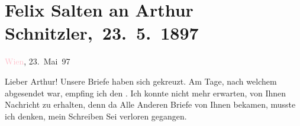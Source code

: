 

\renewcommand{\erwaehntePersonen}{Personen: Richard Beer-Hofmann,  Elisabeth von Österreich-Ungarn,  Franz Joseph I. von Österreich-Ungarn, Paul Goldmann, Hugo von Hofmannsthal, Richard Metzl, Louise Metzl, Felix Salten, Ottilie Salten, Adele Sandrock}
\renewcommand{\erwaehnteInstitutionen}{Institutionen: Franz-Joseph-Orden}
\renewcommand{\erwaehnteOrte}{Orte: London, Ostsee, Paris, Riga, Russland, Wien}
\renewcommand{\erwaehnteWerke}{}
\section[ Felix Salten an Arthur Schnitzler, 23. 5. 1897]{Felix Salten an Arthur Schnitzler, 23. 5. 1897}
\nopagebreak{}
\rehead{ }\normalsize\beginnumbering{}
\toendnotes[C]{\smallbreak\pagebreak[2]}
\toendnotes[C]{\smallbreak}
\pstart
           \raggedleft{}{\pb}\textcolor{pink}{Wien}{}\ledrightnote{\textcolor{pink}{Wien}}, 23. Mai 97\pend
           
\pstart
           Lieber Arthur! Unsere Briefe haben sich gekreuzt. Am Tage, nach
               welchem \label{K_L03266-1v}\label{K_L03266-1h} abgesendet war, empfing ich den \label{K_L03266-2v}\label{K_L03266-2h}. Ich konnte nicht mehr erwarten, von
               Ihnen Nachricht zu erhalten, denn da Alle Anderen Briefe von Ihnen bekamen, musste
               ich denken, mein Schreiben Sei verloren gegangen.\pend
           
